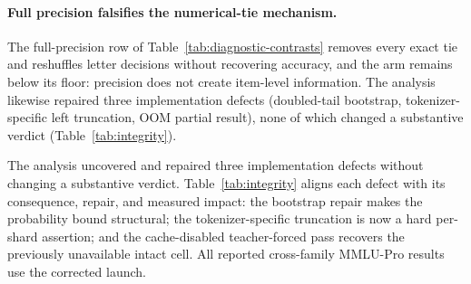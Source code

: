 \paragraph{Full precision falsifies the numerical-tie mechanism.}
The full-precision row of Table~\ref{tab:diagnostic-contrasts} removes every exact tie and reshuffles letter decisions without recovering accuracy, and the arm remains below its floor: precision does not create item-level information. The analysis likewise repaired three implementation defects (doubled-tail bootstrap, tokenizer-specific left truncation, OOM partial result), none of which changed a substantive verdict (Table~\ref{tab:integrity}).

The analysis uncovered and repaired three implementation defects without changing a substantive verdict. Table~\ref{tab:integrity} aligns each defect with its consequence, repair, and measured impact: the bootstrap repair makes the probability bound structural; the tokenizer-specific truncation is now a hard per-shard assertion; and the cache-disabled teacher-forced pass recovers the previously unavailable intact cell. All reported cross-family MMLU-Pro results use the corrected launch.
